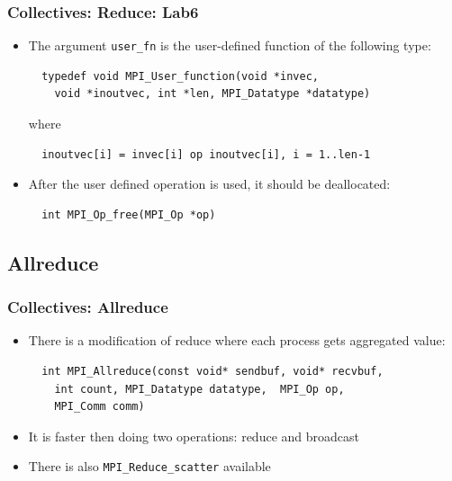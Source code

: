 \documentclass{beamer}
\begin{document}
\begin{frame}[fragile]
  \frametitle{Collectives: Reduce: Lab6}
\begin{itemize}
\item The argument {\color{mycolorcode}\verb|user_fn|} is the user-defined function of the following type:
{\color{mycolorcode}
\begin{verbatim}
  typedef void MPI_User_function(void *invec, 
    void *inoutvec, int *len, MPI_Datatype *datatype)
\end{verbatim}
}
where 
{\color{mycolorcode}
\begin{verbatim}
  inoutvec[i] = invec[i] op inoutvec[i], i = 1..len-1
\end{verbatim}
}
\item After the user defined operation is used, it should be deallocated:
{\color{mycolorcode}
\begin{verbatim}
  int MPI_Op_free(MPI_Op *op)
\end{verbatim}
} 
\end{itemize}

\end{frame}

\subsection{Allreduce}
\begin{frame}[fragile]
  \frametitle{Collectives: Allreduce}
\begin{itemize}
\item There is a modification of reduce where each process gets aggregated value:
{\color{mycolorcode}
\begin{verbatim}
  int MPI_Allreduce(const void* sendbuf, void* recvbuf, 
    int count, MPI_Datatype datatype,  MPI_Op op, 
    MPI_Comm comm)
\end{verbatim}
}
\item It is faster then doing two operations: reduce and broadcast
\item There is also {\color{mycolorcode}\verb|MPI_Reduce_scatter|} available
\end{itemize}
\end{frame}
\end{document}
